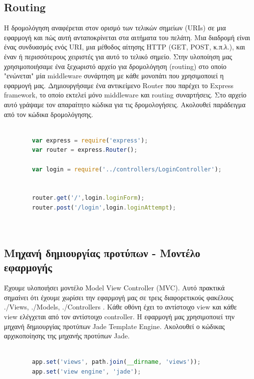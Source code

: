 		\subsection{Routing}
	
		Η δρομολόγηση αναφέρεται στον ορισμό των τελικών σημείων (URIs) σε μια εφαρμογή και πώς αυτή ανταποκρίνεται στα αιτήματα του πελάτη. Μια διαδρομή είναι ένας συνδυασμός ενός URI, μια μέθοδος αίτησης HTTP (GET, POST, κ.π.λ.), και έναν ή περισσότερους χειριστές για αυτό το τελικό σημείο. 
		Στην υλοποίηση μας χρησιμοποιήσαμε ένα ξεχωριστό αρχείο για δρομολόγηση (routing) στο οποίο "ενώνεται" μία middleware συνάρτηση με κάθε μονοπάτι που χρησιμοποιεί η εφαρμογή μας. Δημιουργήσαμε ένα αντικείμενο Router που παρέχει το Express framework, το οποίο εκτελεί μόνο middleware και routing συναρτήσεις. Στο αρχείο αυτό γράψαμε τον απαραίτητο κώδικα για τις δρομολογήσεις. Ακολουθεί παράδειγμα από τον κώδικα δρομολόγησης.

		\begin{lstlisting}[language=Javascript]			
		
		var express = require('express');
		var router = express.Router(); 

		var login = require('../controllers/LoginController');


		router.get('/',login.loginForm); 
		router.post('/login',login.loginAttempt);
	
	
	 		\end{lstlisting}
	 		
	\subsection*{Μηχανή δημιουργίας προτύπων - Μοντέλο εφαρμογής }

		Έχουμε υλοποιήσει μοντέλο Model View Controller (MVC). Αυτό πρακτικά σημαίνει ότι έχουμε χωρίσει την εφαρμογή μας σε τρεις διαφορετικούς φακέλους  ./Views, ./Models, ./Controllers . Κάθε οθόνη έχει το αντίστοιχο view και κάθε view ελέγχεται από τον αντίστοιχο controller.  
		Η εφαρμογή μας χρησιμοποιεί την μηχανή δημιουργίας προτύπων Jade Template Engine. Ακολουθεί ο κώδικας αρχικοποίησης της μηχανής προτύπων Jade.
		
		\begin{lstlisting}[language=Javascript]			
		
		app.set('views', path.join(__dirname, 'views'));
		app.set('view engine', 'jade');
	
		\end{lstlisting}
		
